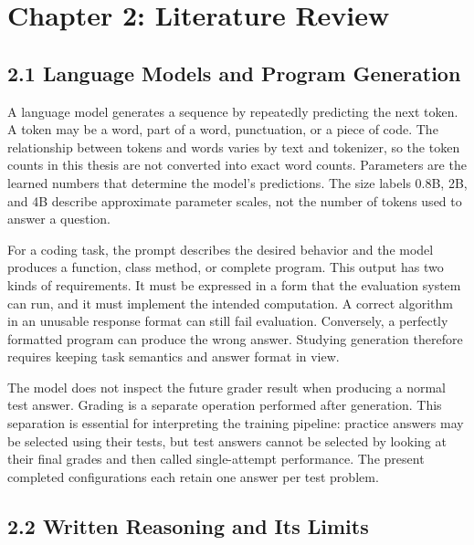 \documentclass[11pt,letterpaper]{article}
\begin{document}
\clearpage

\section*{Chapter 2: Literature Review}

\subsection*{2.1 Language Models and Program Generation}

A language model generates a sequence by repeatedly predicting the next token. A token may be a word, part of a word, punctuation, or a piece of code. The relationship between tokens and words varies by text and tokenizer, so the token counts in this thesis are not converted into exact word counts. Parameters are the learned numbers that determine the model's predictions. The size labels 0.8B, 2B, and 4B describe approximate parameter scales, not the number of tokens used to answer a question.\par

For a coding task, the prompt describes the desired behavior and the model produces a function, class method, or complete program. This output has two kinds of requirements. It must be expressed in a form that the evaluation system can run, and it must implement the intended computation. A correct algorithm in an unusable response format can still fail evaluation. Conversely, a perfectly formatted program can produce the wrong answer. Studying generation therefore requires keeping task semantics and answer format in view.\par

The model does not inspect the future grader result when producing a normal test answer. Grading is a separate operation performed after generation. This separation is essential for interpreting the training pipeline: practice answers may be selected using their tests, but test answers cannot be selected by looking at their final grades and then called single-attempt performance. The present completed configurations each retain one answer per test problem.\par

\subsection*{2.2 Written Reasoning and Its Limits}
\end{document}
